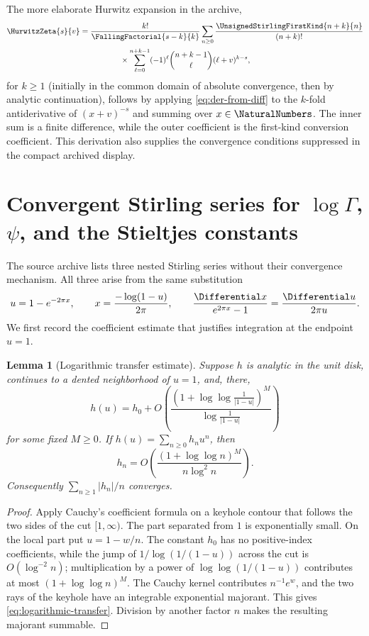 \documentclass[11pt,a4paper,oneside,openany]{book}
\newtheorem{lemma}[theorem]{Lemma}
\theoremstyle{definition}
\theoremstyle{remark}
\begin{document}
The more elaborate Hurwitz expansion in the archive,
\begin{multline}\label{eq:hurwitz-finite-difference-expansion}
 \HurwitzZeta{s}{v}=\frac{k!}{\FallingFactorial{s-k}{k}}
 \sum_{n\ge0}\frac{\UnsignedStirlingFirstKind{n+k}{n}}{(n+k)!}\\
 {}\times\sum_{\ell=0}^{n+k-1}(-1)^\ell\binom{n+k-1}{\ell}
 (\ell+v)^{k-s},
\end{multline}
for $k\ge1$ (initially in the common domain of absolute convergence, then by
analytic continuation), follows by applying \cref{eq:der-from-diff} to the
$k$-fold antiderivative of $(x+v)^{-s}$ and summing over $x\in\NaturalNumbers$.  The inner sum is
a finite difference, while the outer coefficient is the first-kind conversion
coefficient.  This derivation also supplies the convergence conditions suppressed in
the compact archived display.


\section{Convergent Stirling series for \texorpdfstring{$\log\Gamma$}{log Gamma}, \texorpdfstring{$\psi$}{psi}, and the Stieltjes constants}
The source archive lists three nested Stirling series without their convergence
mechanism.  All three arise from the same substitution
\begin{equation}
\label{eq:logarithmic-binet-substitution}
 u=1-e^{-2\pi x},
 \qquad
 x=\frac{-\log(1-u)}{2\pi},
 \qquad
 \frac{\Differential x}{e^{2\pi x}-1}=\frac{\Differential u}{2\pi u}.
\end{equation}
We first record the coefficient estimate that justifies integration at the endpoint
$u=1$.

\begin{lemma}[Logarithmic transfer estimate]
\label{lem:logarithmic-transfer}
Suppose $h$ is analytic in the unit disk, continues to a dented neighborhood of
$u=1$, and, there,
\[
 h(u)=h_0+O\!\left(
 \frac{(1+\log\log\frac1{|1-u|})^M}
      {\log\frac1{|1-u|}}
 \right)
\]
for some fixed $M\ge0$.  If $h(u)=\sum_{n\ge0}h_nu^n$, then
\begin{equation}
\label{eq:logarithmic-transfer}
 h_n=O\!\left(
 \frac{(1+\log\log n)^M}{n\log^2 n}
 \right).
\end{equation}
Consequently $\sum_{n\ge1}|h_n|/n$ converges.
\end{lemma}
\begin{proof}
Apply Cauchy's coefficient formula on a keyhole contour that follows the two sides
of the cut $[1,\infty)$.  The part separated from $1$ is exponentially small.
On the local part put $u=1-w/n$.  The constant $h_0$ has no positive-index
coefficients, while the jump of
$1/\log(1/(1-u))$ across the cut is
$O(\log^{-2}n)$; multiplication by a power of $\log\log(1/(1-u))$ contributes at
most $(1+\log\log n)^M$.  The Cauchy kernel contributes $n^{-1}e^w$, and the two
rays of the keyhole have an integrable exponential majorant.  This gives
\eqref{eq:logarithmic-transfer}.  Division by another factor $n$ makes the
resulting majorant summable.
\end{proof}
\end{document}

